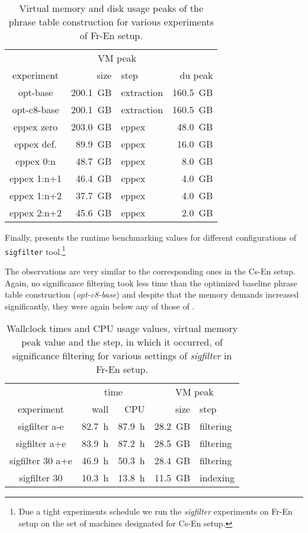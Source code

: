 \begin{table}[ht]
\centering
\begin{tabular}{ | c | r l | r | }
\hline
 & \multicolumn{2}{|c|}{VM peak} & \\
experiment & size & step & du peak \\
\hline
\hline
opt-base       & 200.1~GB & extraction & 160.5~GB \\
opt-c8-base    & 200.1~GB & extraction & 160.5~GB \\
eppex zero     & 203.0~GB &      eppex &  48.0~GB \\
\hline
eppex def.     &  89.9~GB &      eppex &  16.0~GB \\
eppex 0:n      &  48.7~GB &      eppex &   8.0~GB \\
eppex 1:n+1    &  46.4~GB &      eppex &   4.0~GB \\
eppex 1:n+2    &  37.7~GB &      eppex &   4.0~GB \\
eppex 2:n+2    &  45.6~GB &      eppex &   2.0~GB \\
\hline
\end{tabular}
\caption{\label{fr-en-vm-and-disk-usage-peaks}
Virtual memory and disk usage peaks of the phrase table construction for various experiments of Fr-En setup.}
\end{table}

Finally,  presents the runtime benchmarking
values for different configurations of \texttt{sigfilter} tool.\footnote{Due a tight
experiments schedule we run the \emph{sigfilter} experiments on Fr-En setup on the set of
machines designated for Cs-En setup.}

The observations are very similar to the corresponding ones in the Cs-En setup.
Again, no significance filtering took less time than the optimized baseline phrase table
construction (\emph{opt-c8-base}) and despite that the memory demands increased
significantly, they were again below any of those of \eppex{}.

\begin{table}[ht]
\centering
\begin{tabular}{ | c | r r | r l | }
\hline
 & \multicolumn{2}{|c|}{time} & \multicolumn{2}{|c|}{VM peak} \\
experiment & wall & CPU & size & step \\
\hline
\hline
sigfilter a-e     & 82.7~h & 87.9~h & 28.2~GB & filtering \\
sigfilter a+e     & 83.9~h & 87.2~h & 28.5~GB & filtering \\
sigfilter 30 a+e  & 46.9~h & 50.3~h & 28.4~GB & filtering \\
sigfilter 30      & 10.3~h & 13.8~h & 11.5~GB & indexing \\
\hline
\end{tabular}
\caption{\label{fr-en-sigfilter-runtime-benchmarks}
Wallclock times and CPU usage values, virtual memory peak value and the step,
in which it occurred, of significance filtering for various settings of \emph{sigfilter} in Fr-En setup.}
\end{table}

